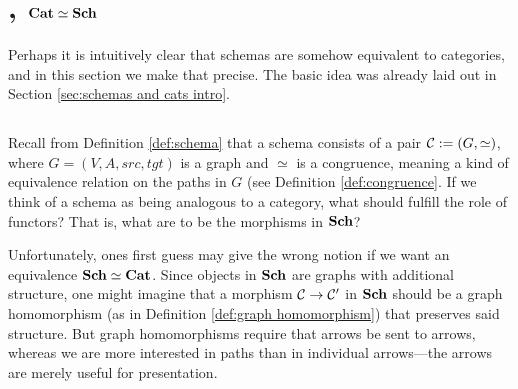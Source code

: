 \documentclass[CT4S-EN-RU]{subfiles}
\begin{document}
\section{, \texorpdfstring{${\mathbf{Cat}}\simeq{\mathbf{Sch}}$}{Cat = Sch}}\label{sec:cat equiv sch}

\begin{blockENG}
Perhaps it is intuitively clear that schemas are somehow equivalent to categories, and in this section we make that precise. The basic idea was already laid out in Section \ref{sec:schemas and cats intro}.
\end{blockENG}

\begin{blockRUS}
\end{blockRUS}


\subsection{}\label{sec:sch as category}

\begin{blockENG}
Recall from Definition \ref{def:schema} that a schema consists of a pair $\mathcal{C}:=(G,\simeq)$, where $G=(V,A,src,tgt)$ is a graph and $\simeq$ is a congruence, meaning a kind of equivalence relation on the paths in $G$ (see Definition \ref{def:congruence}. If we think of a schema as being analogous to a category, what should fulfill the role of functors? That is, what are to be the morphisms in ${\mathbf{Sch}}$?
\end{blockENG}

\begin{blockRUS}
\end{blockRUS}

\begin{blockENG}
Unfortunately, ones first guess may give the wrong notion if we want an equivalence ${\mathbf{Sch}}\simeq{\mathbf{Cat}}$. Since objects in ${\mathbf{Sch}}$ are graphs with additional structure, one might imagine that a morphism $\mathcal{C}\rightarrow\mathcal{C}'$ in ${\mathbf{Sch}}$ should be a graph homomorphism (as in Definition \ref{def:graph homomorphism}) that preserves said structure. But graph homomorphisms require that arrows be sent to arrows, whereas we are more interested in paths than in individual arrows—the arrows are merely useful for presentation. 
\end{blockENG}
\end{document}
